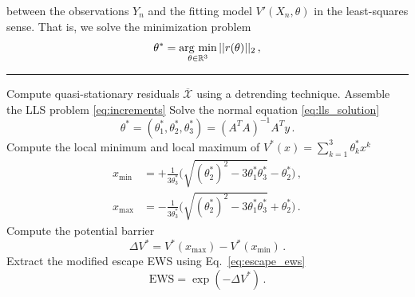 \documentclass[10pt]{article}
\begin{document}
%
between the observations $Y_n$ and the fitting model $V'(X_n,\theta)$ in the least-squares sense.
That is, we solve the minimization problem
%
\begin{equation}\label{eq:lls_problem}
        \theta^{*} = \operatorname*{\arg\,min}_{\theta\in \mathbb{R}^{3}}||r(\theta)||_{2}\,,
\end{equation}
%
\begin{algorithm}[!tp]
        \DontPrintSemicolon
        \SetAlgoNoLine
        \BlankLine 
        \BlankLine 
        \hrule
        \BlankLine
        \nl Compute quasi-stationary residuals $\overline{\mathcal{X}}$ using a detrending technique.
        \BlankLine
        \nl Assemble the LLS problem \eqref{eq:increments}\;
        \Indp{}
        \Indm\BlankLine
        \nl Solve the normal equation \eqref{eq:lls_solution}
        \begin{equation*}
                \theta^* = (\theta^*_1, \theta^*_2, \theta^*_3) = (A^TA)^{-1}A^Ty\,.
        \end{equation*}
        \BlankLine
        \nl Compute the local minimum and local maximum of $V^*(x)=\sum_{k=1}^{3}\theta_k^*x^k$
        \begin{align*}
                x_{\text{min}} &= + \frac{1}{3\theta^*_3}\bigg(\sqrt{(\theta_2^*)^2 - 3\theta_1^*\theta_3^*} - \theta^*_2\bigg)\,,\\
                x_{\text{max}} &= - \frac{1}{3\theta^*_3}\bigg(\sqrt{(\theta_2^*)^2 - 3\theta_1^*\theta_3^*} + \theta^*_2\bigg)\,.
        \end{align*}
        \BlankLine
        \nl Compute the potential barrier 
        \begin{equation*}
                \Delta V^*=V^*(x_{\text{max}}) - V^*(x_{\text{min}})\,.
        \end{equation*}
        \BlankLine
        \nl Extract the modified escape EWS using Eq.~\eqref{eq:escape_ews}
        \begin{equation*}
                \text{EWS} = \exp(-\Delta V^*)\,.
        \end{equation*}
        \vspace{-10pt}
        \caption{Extraction of the modified escape EWS from timeseries data.}
        \label{alg:modified_ews}
\end{algorithm}
\end{document}
